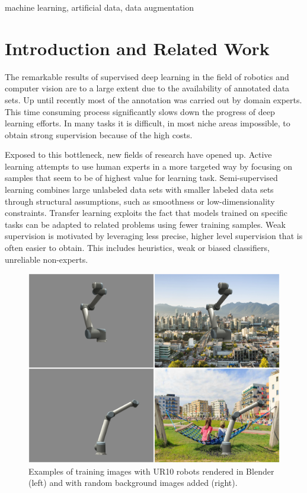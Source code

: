 \documentclass[conference]{IEEEtran}
\begin{document}
\begin{IEEEkeywords}
machine learning, artificial data, data augmentation
\end{IEEEkeywords}

\section{Introduction and Related Work}
The remarkable results of supervised deep learning in the field of robotics and computer vision are to a large extent due to the availability of annotated data sets. Up until recently most of the annotation was carried out by domain experts. This time consuming process significantly slows down the progress of deep learning efforts. In many tasks it is difficult, in most niche areas impossible, to obtain strong supervision because of the high costs.

Exposed to this bottleneck, new fields of research have opened up. Active learning \cite{druck2009active, settles2012active, cakmak2012designing} attempts to use human experts in a more targeted way by focusing on samples that seem to be of highest value for learning task. Semi-supervised learning \cite{chapelle2009semi, salimans2016improved, zhu2006semi} combines large unlabeled data sets with smaller labeled data sets through structural assumptions, such as smoothness or low-dimensionality constraints. Transfer learning \cite{pratt1993discriminability, ventura2007theoretical, pan2010survey} exploits the fact that models trained on specific tasks can be adapted to related problems using fewer training samples. Weak supervision \cite{ratner2016data, zhou2017brief} is motivated by leveraging less precise, higher level supervision that is often easier to obtain. This includes heuristics, weak or biased classifiers, unreliable non-experts. 

\begin{figure}[htbp]
    \centerline{\includegraphics[width=0.9\columnwidth]{figures/examplesUR10/renderedImages.png}}
    \caption{\label{fig:ur10examples} Examples of training images with UR10 robots rendered in Blender (left) and with random background images added (right).}
\end{figure}
\end{document}
